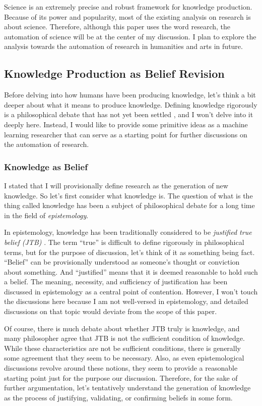\documentclass{book}
\begin{document}
Science is an extremely precise and robust  framework for knowledge production. Because of its power and popularity, most of the existing analysis on research is about science. Therefore, although this paper uses the word research, the automation of science will be at the center of my discussion. I plan to explore the analysis towards the automation of research in humanities and arts in future.

\subsection{Knowledge Production as Belief Revision}
Before delving into how humans have been producing knowledge, let's think a bit deeper about what it means to produce knowledge. Defining knowledge rigorously is a philosophical debate that has not yet been settled \cite{sep-epistemology}, and I won't delve into it deeply here. Instead, I would like to provide some primitive ideas as a machine learning researcher that can serve as a starting point for further discussions on the automation of research.

\subsubsection{Knowledge as Belief}
I stated that I will provisionally define research as the generation of new knowledge. So let's first consider what knowledge is. The question of what is the thing called knowledge has been a subject of philosophical debate for a long time in the field of \textit{epistemology}.

In epistemology, knowledge has been traditionally considered to be \textit{justified true belief (JTB)} \cite{sep-epistemology}. The term ``true'' is difficult to define rigorously in philosophical terms, but for the purpose of discussion, let's think of it as something being fact. ``Belief'' can be provisionally understood as someone's thought or conviction about something. And ``justified'' means that it is deemed reasonable to hold such a belief. The meaning, necessity, and sufficiency of justification has been discussed in epistemology as a central point of contention. However, I won't touch the discussions here because I am 
 not well-versed in epistemology, and detailed discussions on that topic would deviate from the scope of this paper.

Of course, there is much debate about whether JTB truly is knowledge, and many philosopher agree that JTB is not the sufficient condition of knowledge. While these characteristics are not be sufficient conditions, there is generally some agreement that they seem to be necessary. Also, as even epistemological discussions revolve around these notions, they seem to provide a reasonable starting point just for the purpose our discussion. Therefore, for the sake of further argumentation, let's tentatively understand the generation of knowledge as the process of justifying, validating, or confirming beliefs in some form.
\end{document}
